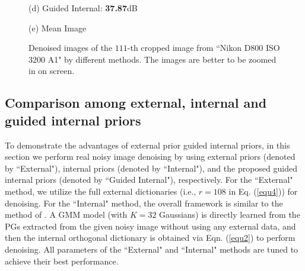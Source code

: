 \documentclass[10pt,twocolumn,letterpaper]{article}
\begin{document}
\begin{figure}
{\begin{minipage}[t]{0.195\textwidth}
{\footnotesize (d) Guided Internal: \textbf{37.87}dB }
\end{minipage}
\begin{minipage}[t]{0.195\textwidth}
\centering
{}
{\footnotesize (e) Mean Image \cite{crosschannel2016}}
\end{minipage}
}\vspace{-1mm}
\caption{Denoised images of the $111$-th cropped image from ``Nikon D800 ISO 3200 A1" \cite{crosschannel2016} by different methods. The images are better to be zoomed in on screen.}
\vspace{-2mm}
\label{fig5}
\end{figure}

\vspace{-1mm}
\subsection{Comparison among external, internal and guided internal priors}

To demonstrate the advantages of external prior guided internal priors, in this section we perform real noisy image denoising by using external priors (denoted by ``External"), internal priors (denoted by ``Internal"), and the proposed guided internal priors (denoted by ``Guided Internal"), respectively. For the ``External" method, we utilize the full external dictionaries (i.e., $r=108$ in Eq. (\ref{equ4})) for denoising. For the ``Internal" method, the overall framework is similar to the method of \cite{ncsr}. A GMM model (with $K = 32$ Gaussians) is directly learned from the PGs extracted from the given noisy image without using any external data, and then the internal orthogonal dictionary is obtained via Eqn. (\ref{equ2}) to perform denoising. All parameters of the ``External" and ``Internal" methods are tuned to achieve their best performance. 
\end{document}
